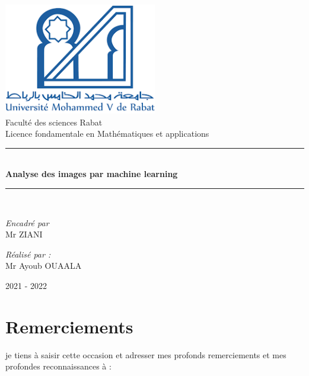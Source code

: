 \documentclass[a4paper,12pt]{report}
\begin{document}
\begin{titlepage}
\begin{center} 
    
   \includegraphics[width=0.5\textwidth]{logo.png}\\[1cm]
   {\large Faculté des sciences Rabat}\\[0.5cm]
   {\large Licence fondamentale en Mathématiques et applications  }\\[0.5cm]
      
   \rule{\linewidth}{0.5mm} \\[0.4cm]
   { \huge \bfseries Analyse des images par machine learning \\[0.4cm] }
   \rule{\linewidth}{0.5mm} \\[1.5cm]
      
   \noindent
   \begin{minipage}{0.4\textwidth}
   \begin{flushleft} \large
   \emph{Encadré par}\\
   Mr\up{} \textsc{ZIANI}\\
         
   \end{flushleft}
   \end{minipage}%
   \begin{minipage}{0.4\textwidth}
   \begin{flushright} \large
   \emph{Réalisé par :}\\
      Mr\up{} Ayoub \textsc{OUAALA}\\
   \end{flushright}
   \end{minipage}
    
\vfill
   
{\large 2021 - 2022 }
   
\end{center}
\end{titlepage}


\section*{Remerciements}
je tiens à saisir cette occasion et adresser mes profonds remerciements et mes profondes reconnaissances à :\\
\end{document}
